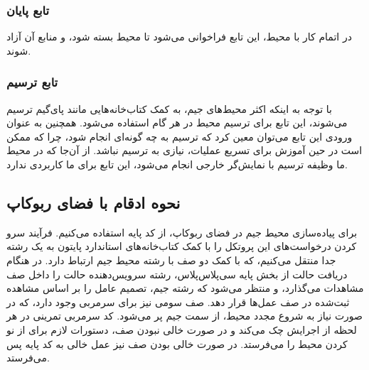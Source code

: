 \subsubsection{تابع پایان}
در اتمام کار با محیط، این تابع فراخوانی می‌شود تا محیط بسته شود، و منابع آن آزاد شوند.
\subsubsection{تابع ترسیم}
با توجه به اینکه اکثر محیط‌های جیم، به کمک کتاب‌خانه‌هایی مانند پای‌گیم
ترسیم می‌شوند، این تابع برای ترسیم محیط در هر گام استفاده می‌شود.
همچنین به عنوان ورودی این تابع می‌توان معین کرد که ترسیم به چه گونه‌ای انجام شود، چرا که ممکن است در حین آموزش برای تسریع عملیات، نیازی به ترسیم نباشد.
از آن‌جا که در محیط ما وظیفه ترسیم با نمایش‌گر خارجی انجام می‌شود، این تابع برای ما کاربردی ندارد. 
\subsection{نحوه ادقام با فضای ربوکاپ}
برای پیاده‌سازی محیط جیم در فضای ربوکاپ، از کد پایه  استفاده می‌کنیم.
فرآیند سرو کردن درخواست‌های این پروتکل را با کمک کتاب‌خانه‌های استاندارد پایتون به یک رشته
جدا منتقل می‌کنیم، که با کمک دو صف با رشته محیط جیم ارتباط دارد.
در هنگام دریافت حالت از بخش پایه سی‌پلاس‌پلاس،
رشته سرویس‌دهنده حالت را داخل صف مشاهدات می‌گذارد، و منتظر می‌شود که رشته جیم، تصمیم عامل را بر اساس مشاهده ثبت‌شده در صف عمل‌ها قرار دهد.
صف سومی نیز برای سرمربی وجود دارد، که در صورت نیاز به شروع مجدد محیط، از سمت جیم پر می‌شود. 
کد سرمربی تمرینی در هر لحظه از اجرایش چک می‌کند و در صورت خالی نبودن صف، دستورات لازم برای از نو کردن محیط را می‌فرستد. در صورت خالی بودن صف نیز عمل خالی به کد پایه پس می‌فرستد.

